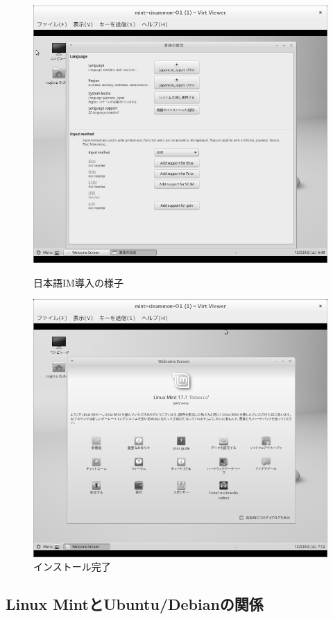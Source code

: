 \documentclass[mingoth,a4paper]{jsarticle}
\begin{document}
\begin{figure}[H]
\begin{minipage}{0.5\hsize}
\centering
\includegraphics[width=0.8\hsize]{image201412/mint-im-setup_mono.png}
\caption{日本語IM導入の様子}\label{fig:mint-im-setup}
\end{minipage}
\begin{minipage}{0.5\hsize}
\centering
\includegraphics[width=0.8\hsize]{image201412/mint-setupcomplete_mono.png}
\caption{インストール完了}\label{fig:mint-setupcomplete}
\end{minipage}
\end{figure}

 \subsection{Linux MintとUbuntu/Debianの関係}
\end{document}
